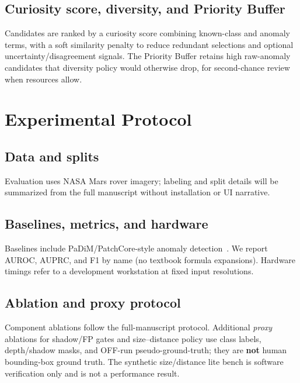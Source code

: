 \documentclass[10pt,twocolumn,letterpaper]{article}
\begin{document}
\subsection{Curiosity score, diversity, and Priority Buffer}
Candidates are ranked by a curiosity score combining known-class and anomaly terms, with a
soft similarity penalty to reduce redundant selections and optional uncertainty/disagreement
signals.
The Priority Buffer retains high raw-anomaly candidates that diversity policy would otherwise
drop, for second-chance review when resources allow.

\section{Experimental Protocol}
\subsection{Data and splits}
Evaluation uses NASA Mars rover imagery; labeling and split details will be summarized from
the full manuscript without installation or UI narrative.

\subsection{Baselines, metrics, and hardware}
Baselines include PaDiM/PatchCore-style anomaly detection~\citep{defard2020padim,roth2022patchcore}.
We report AUROC, AUPRC, and F1 by name (no textbook formula expansions).
Hardware timings refer to a development workstation at fixed input resolutions.

\subsection{Ablation and proxy protocol}
Component ablations follow the full-manuscript protocol.
Additional \emph{proxy} ablations for shadow/FP gates and size--distance policy use class
labels, depth/shadow masks, and OFF-run pseudo-ground-truth; they are \textbf{not} human
bounding-box ground truth.
The synthetic size/distance lite bench is software verification only and is not a performance
result.
\end{document}
